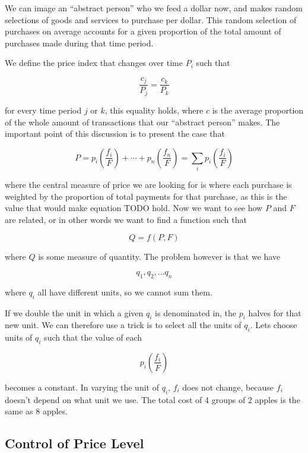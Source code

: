 We can image an ``abstract person'' who we feed a dollar now, and makes random selections of goods
and services to purchase per dollar. This random selection of purchases on average accounts for a
given proportion of the total amount of purchases made during that time period. 

We define the price index that changes over time $P_i$ such that

\[
    \frac {c_j} {P_j} = \frac {c_k} {P_k}
\]

for every time period $j$ or $k$, this equality holds, where $c$ is the average proportion of the
whole amount of transactions that our ``abstract person'' makes. The important point of this
discussion is to present the case that 

\[
    P = p_i \left( \frac {f_i} F \right) + \cdots + p_n \left( \frac {f_n} F \right) = \sum_i p_i
    \left( \frac {f_i} F \right)
\]

where the central measure of price we are looking for is where each purchase is weighted by the
proportion of total payments  for that purchase, as this is the value that would make equation TODO
hold. Now we want to see how $P$ and $F$ are related, or in other words we want to find a function
such that

\[
    Q = f(P, F)
\]

where $Q$ is some measure of quantity. The problem however is that we have

\[
    q_1, q_2, \dots q_n
\]

where $q_i$ all have different units, so we cannot sum them.

If we double the unit in which a given $q_i$ is denominated in, the $p_i$ halves for that new unit.
We can therefore use a trick is to select all the units of $q_i$. Lets choose units of $q_i$ such
that the value of each

\[
    p_i \left( \frac {f_i} F \right)
\]

becomes a constant. In varying the unit of $q_i$, $f_i$ does not change, because $f_i$ doesn't
depend on what unit we use. The total cost of 4 groups of 2 apples is the same as 8 apples.














\subsection{Control of Price Level}

